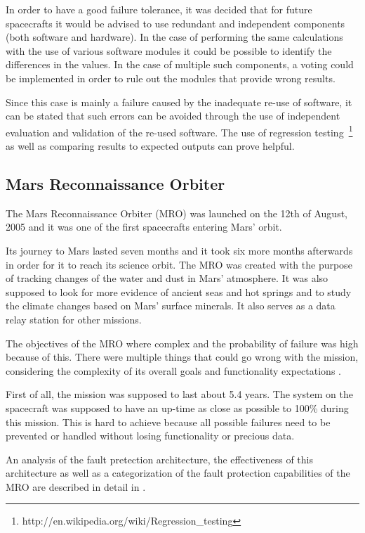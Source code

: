 In order to have a good failure tolerance, it was decided that for future
spacecrafts it would be advised to use redundant and independent components
(both software and hardware). In the case of performing the same calculations
with the use of various software modules it could be possible to identify the
differences in the values. In the case of multiple such components, a voting
could be implemented in order to rule out the modules that provide wrong
results.

Since this case is mainly a failure caused by the inadequate re-use of
software, it can be stated that such errors can be avoided through the use of
independent evaluation and validation of the re-used software. The use of
regression testing~\footnote{http://en.wikipedia.org/wiki/Regression\_testing}
as well as comparing results to expected outputs can prove helpful.
\subsection{Mars Reconnaissance Orbiter\cite{mro-nasa}}

The Mars Reconnaissance Orbiter (MRO) was launched on the 12th of August, 2005
and it was one of the first spacecrafts entering Mars' orbit.

Its journey to Mars lasted seven months and it took six more months afterwards
in order for it to reach its science orbit. The MRO was created with the purpose
of tracking changes of the water and dust in Mars' atmosphere. It was also
supposed to look for more evidence of ancient seas and hot springs and to study
the climate changes based on Mars' surface minerals. It also serves as a data
relay station for other missions.

The objectives of the MRO where complex and the probability of failure was high
because of this. There were multiple things that could go wrong with the
mission, considering the complexity of its overall goals and functionality
expectations \cite{mro-mission}.

First of all, the mission was supposed to last about 5.4 years. The system on the spacecraft was supposed
to have an up-time as close as possible to 100\% during this mission. This is
hard to achieve because all possible failures need to be prevented or handled
without losing functionality or precious data.

An analysis of the fault pretection architecture, the effectiveness of this
architecture as well as a categorization of the fault protection capabilities of
the MRO are described in detail in \cite{surv-nasa-mars}.

